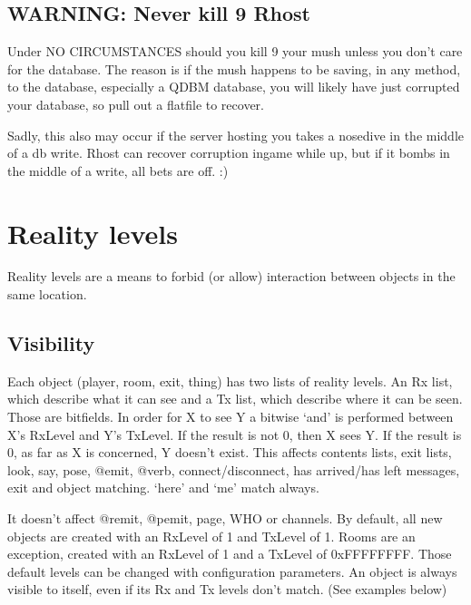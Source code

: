 \documentclass[letterpaper,10pt,english]{sphinxmanual}
\begin{document}
\subsection{WARNING: Never kill \sphinxhyphen{}9 Rhost}
\label{\detokenize{advanced:warning-never-kill-9-rhost}}
\sphinxAtStartPar
Under NO CIRCUMSTANCES should you kill \sphinxhyphen{}9 your mush unless you don’t care for the
database.  The reason is if the mush happens to be saving, in any method, to the
database, especially a QDBM database, you will likely have just corrupted your
database, so pull out a flatfile to recover.

\sphinxAtStartPar
Sadly, this also may occur if the server hosting you takes a nose\sphinxhyphen{}dive in the middle
of a db write.  Rhost can recover corruption in\sphinxhyphen{}game while up, but if it bombs
in the middle of a write, all bets are off. :)


\section{Reality levels}
\label{\detokenize{advanced:reality-levels}}
\sphinxAtStartPar
Reality levels are a means to forbid (or allow) interaction between objects
in the same location.


\subsection{Visibility}
\label{\detokenize{advanced:visibility}}
\sphinxAtStartPar
Each object (player, room, exit, thing) has two lists of reality levels.
An Rx list, which describe what it can see and a Tx list, which describe
where it can be seen. Those are bitfields. In order for X to see Y a bitwise
‘and’ is performed between X’s RxLevel and Y’s TxLevel. If the result is not
0, then X sees Y. If the result is 0, as far as X is concerned, Y doesn’t
exist. This affects contents lists, exit lists, look, say, pose, @emit,
@verb, connect/disconnect, has arrived/has left messages, exit and object
matching. ‘here’ and ‘me’ match always.

\sphinxAtStartPar
It doesn’t affect @remit, @pemit, page, WHO or channels.
By default, all new objects are created with an RxLevel of 1 and TxLevel of
1. Rooms are an exception, created with an RxLevel of 1 and a TxLevel of
0xFFFFFFFF. Those default levels can be changed with configuration
parameters.
An object is always visible to itself, even if its Rx and Tx levels don’t
match. (See examples below)
\end{document}
